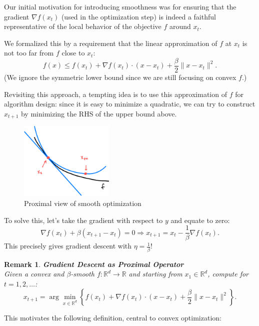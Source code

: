 \documentclass[11pt]{book} %
\newtheorem*{remark*}{Remark}
\begin{document}
Our initial motivation for introducing smoothness was for ensuring that the gradient $\nabla f(x_t)$ 
(used in the optimization step) is indeed a faithful representative of the local behavior of the objective $f$ around $x_t$.

We formalized this by a requirement that the linear approximation of $f$ at $x_t$ is not too far from $f$ close to $x_t$: 
\[
f(x) \leq f(x_t) + \nabla f(x_t) \cdot (x - x_t) + \frac{\beta}{2} \|x - x_t\|^2.
\]
(We ignore the symmetric lower bound since we are still focusing on convex $f$.)

Revisiting this approach, a tempting idea is to use this approximation of $f$ for algorithm design: since it is easy to minimize a quadratic, we can try to construct $x_{t+1}$ by minimizing the RHS of the upper bound above.

\begin{figure}[H]
    \centering
    \includegraphics[width=0.4\textwidth]{Figs/proximal_view_of_smooth_optimization.png}
    \caption{Proximal view of smooth optimization}
\end{figure}

To solve this, let's take the gradient with respect to \( y \) and equate to zero:
\[
\nabla f(x_t) + \beta (x_{t+1} - x_t) = 0 \Rightarrow x_{t+1} = x_t - \frac{1}{\beta} \nabla f(x_t).
\]
This precisely gives gradient descent with \( \eta = \frac{1}{\beta} \)!

\begin{remark*}{\textbf{Gradient Descent as Proximal Operator}} \\
    Given a convex and \(\beta\)-smooth \( f \colon \mathbb{R}^d \rightarrow \mathbb{R} \) and starting from \( x_1 \in \mathbb{R}^d \), compute for \( t = 1, 2, \dots \):
    \[
    x_{t+1} = \arg\min_{x \in \mathbb{R}^d} \left\{ f(x_t) + \nabla f(x_t) \cdot (x - x_t) + \frac{\beta}{2} \| x - x_t \|^2 \right\}.
     \]
\end{remark*}

\medbreak

This motivates the following definition, central to convex optimization:
\end{document}
